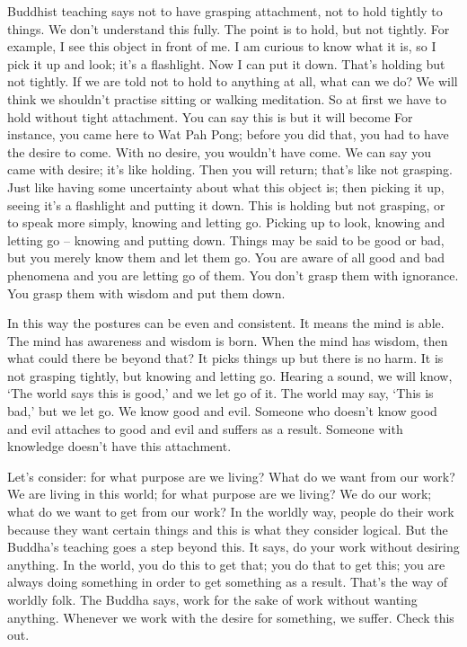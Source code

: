 Buddhist teaching says not to have grasping attachment, not to hold tightly to things. We don't understand this fully. The point is to hold, but not tightly. For example, I see this object in front of me. I am curious to know what it is, so I pick it up and look; it's a flashlight. Now I can put it down. That's holding but not tightly. If we are told not to hold to anything at all, what can we do? We will think we shouldn't practise sitting or walking meditation. So at first we have to hold without tight attachment. You can say this is  but it will become  For instance, you came here to Wat Pah Pong; before you did that, you had to have the desire to come. With no desire, you wouldn't have come. We can say you came with desire; it's like holding. Then you will return; that's like not grasping. Just like having some uncertainty about what this object is; then picking it up, seeing it's a flashlight and putting it down. This is holding but not grasping, or to speak more simply, knowing and letting go. Picking up to look, knowing and letting go -- knowing and putting down. Things may be said to be good or bad, but you merely know them and let them go. You are aware of all good and bad phenomena and you are letting go of them. You don't grasp them with ignorance. You grasp them with wisdom and put them down. 

In this way the postures can be even and consistent. It means the mind is able. The mind has awareness and wisdom is born. When the mind has wisdom, then what could there be beyond that? It picks things up but there is no harm. It is not grasping tightly, but knowing and letting go. Hearing a sound, we will know, `The world says this is good,' and we let go of it. The world may say, `This is bad,' but we let go. We know good and evil. Someone who doesn't know good and evil attaches to good and evil and suffers as a result. Someone with knowledge doesn't have this attachment. 

Let's consider: for what purpose are we living? What do we want from our work? We are living in this world; for what purpose are we living? We do our work; what do we want to get from our work? In the worldly way, people do their work because they want certain things and this is what they consider logical. But the Buddha's teaching goes a step beyond this. It says, do your work without desiring anything. In the world, you do this to get that; you do that to get this; you are always doing something in order to get something as a result. That's the way of worldly folk. The Buddha says, work for the sake of work without wanting anything. Whenever we work with the desire for something, we suffer. Check this out. 
